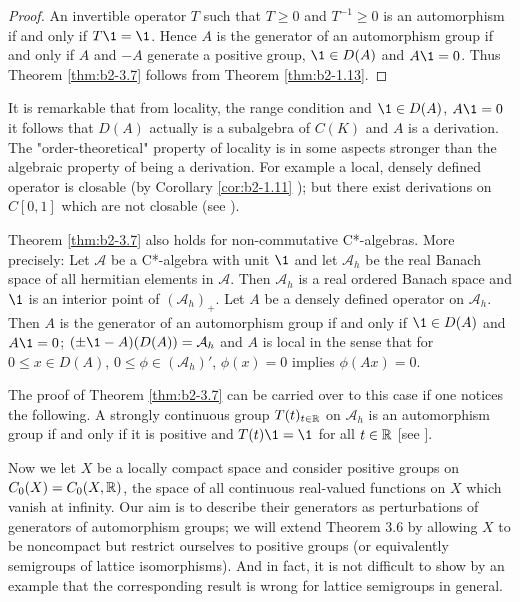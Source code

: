 \begin{proof}
An invertible operator $T$ such that $T \geq 0$ and $T^{-1} \geq 0$ is an automorphism if and only if $T\1 = \1$.
Hence $A$ is the generator of an automorphism group if and only if $A$ and $-A$ generate a positive group, $\1 \in D(A)$ and $A\1 = 0$.
Thus Theorem \ref{thm:b2-3.7} follows from Theorem \ref{thm:b2-1.13}.
\end{proof}

\begin{remark*}\label{rem:b2-3.7a}
It is remarkable that from locality, the range condition and $\1 \in D(A)$, $A\1 = 0$ it follows that $D(A)$ actually is a subalgebra of $C(K)$ and $A$ is a derivation.
The "order-theoretical" property of locality is in some aspects stronger than the algebraic property of being a derivation.
For example a local, densely defined operator is closable (by Corollary \ref{cor:b2-1.11} ); but there exist derivations on $C[0,1]$ which are not closable (see \citet{brattelirobinson:1975}).
\end{remark*}

\begin{remark*}\label{rem:b2-3.7b}
Theorem \ref{thm:b2-3.7} also holds for non-com\-mutative C*-algebras.
More precisely: Let $\mathcal{A}$ be a C*-algebra with unit $\1$ and let $\mathcal{A}_{h}$ be the real Banach space of all hermitian elements in $\mathcal{A}$.
Then $\mathcal{A}_{h}$ is a real ordered Banach space and $\1$ is an interior point of $(\mathcal{A}_{h})_{+}$.
Let $A$ be a densely defined operator on $\mathcal{A}_{h}$.
Then $A$ is the generator of an automorphism group if and only if $\1 \in D(A)$ and $A\1 = 0$; $(\pm\1 - A)(D(A)) = \mathcal{A}_{h}$ and $A$ is local in the sense that for $0 \leq x \in D(A)$, $0 \leq \phi \in (\mathcal{A}_{h})'$, $\phi(x) = 0$ implies $\phi(Ax) = 0$.

The proof of Theorem \ref{thm:b2-3.7} can be carried over to this case if one notices the following.
A strongly continuous group $T(t)_{t \in \mathbb{R}}$ on $\mathcal{A}_{h}$ is an automorphism group if and only if it is positive and $T(t)\1 = \1$ for all $t \in \mathbb{R}$ [see \citet[Corollary 3.2.21]{brattelirobinson:1979}].
\end{remark*}

Now we let $X$ be a locally compact space and consider positive groups on $C_{0}(X) = C_{0}(X,\mathbb{R})$, the space of all continuous real-valued functions on $X$ which vanish at infinity.
Our aim is to describe their generators as perturbations of generators of automorphism groups; \ie  we will extend Theorem 3.6 by allowing $X$ to be noncompact but
restrict ourselves to positive groups (or equivalently semigroups of lattice isomorphisms).
And in fact, it is not difficult to show by an example that the corresponding result is wrong for lattice semigroups in general.

